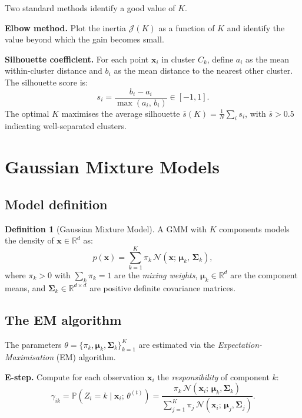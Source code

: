 \documentclass[12pt, a4paper]{report}
\theoremstyle{definition}
\newtheorem{definition}{Definition}[chapter]
\newcommand{\R}{\mathbb{R}}
\begin{document}
Two standard methods identify a good value of $K$.

\textbf{Elbow method.}  Plot the inertia $\mathcal{J}(K)$ as a
function of $K$ and identify the value beyond which the gain becomes
small.

\textbf{Silhouette coefficient.}  For each point $\mathbf{x}_i$ in
cluster $C_k$, define $a_i$ as the mean within-cluster distance and
$b_i$ as the mean distance to the nearest other cluster.  The
silhouette score is:
\begin{equation}
    s_i = \frac{b_i - a_i}{\max(a_i,\, b_i)} \in [-1, 1].
    \label{eq:silhouette}
\end{equation}
The optimal $K$ maximises the average silhouette
$\bar{s}(K) = \frac{1}{N}\sum_i s_i$, with $\bar{s} > 0.5$ indicating
well-separated clusters.

\section{Gaussian Mixture Models}
\label{sec:gmm}

\subsection{Model definition}

\begin{definition}[Gaussian Mixture Model]
A GMM with $K$ components models the density of $\mathbf{x} \in \R^d$
as:
\begin{equation}
    p(\mathbf{x}) = \sum_{k=1}^{K} \pi_k\,
    \mathcal{N}(\mathbf{x};\, \boldsymbol{\mu}_k,\,
    \boldsymbol{\Sigma}_k),
    \label{eq:gmm}
\end{equation}
where $\pi_k > 0$ with $\sum_k \pi_k = 1$ are the \emph{mixing
weights}, $\boldsymbol{\mu}_k \in \R^d$ are the component means, and
$\boldsymbol{\Sigma}_k \in \R^{d \times d}$ are positive definite
covariance matrices.
\end{definition}

\subsection{The EM algorithm}

The parameters $\theta = \{\pi_k, \boldsymbol{\mu}_k,
\boldsymbol{\Sigma}_k\}_{k=1}^K$ are estimated via the
\emph{Expectation-Maximisation} (EM) algorithm.

\textbf{E-step.}  Compute for each observation $\mathbf{x}_i$ the
\emph{responsibility} of component $k$:
\begin{equation}
    \gamma_{ik} = \mathbb{P}(Z_i = k \mid \mathbf{x}_i;\, \theta^{(t)})
    = \frac{\pi_k\,\mathcal{N}(\mathbf{x}_i;\,
      \boldsymbol{\mu}_k, \boldsymbol{\Sigma}_k)}
    {\sum_{j=1}^K \pi_j\,\mathcal{N}(\mathbf{x}_i;\,
      \boldsymbol{\mu}_j, \boldsymbol{\Sigma}_j)}.
    \label{eq:em-estep}
\end{equation}
\end{document}
